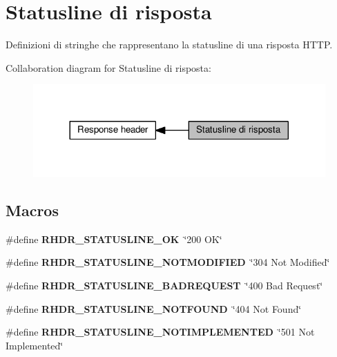 \hypertarget{group__RHDR__STATUSLINE}{}\section{Statusline di risposta}
\label{group__RHDR__STATUSLINE}


Definizioni di stringhe che rappresentano la statusline di una risposta H\+T\+T\+P.  


Collaboration diagram for Statusline di risposta\+:\nopagebreak
\begin{figure}[H]
\begin{center}
\leavevmode
\includegraphics[width=317pt]{group__RHDR__STATUSLINE}
\end{center}
\end{figure}
\subsection*{Macros}
\begin{DoxyCompactItemize}
\item 
\hypertarget{group__RHDR__STATUSLINE_ga52ab6e7e662b67329fe3570d298a09dd}{}\#define {\bfseries R\+H\+D\+R\+\_\+\+S\+T\+A\+T\+U\+S\+L\+I\+N\+E\+\_\+\+O\+K}~\char`\"{}200 O\+K\char`\"{}\label{group__RHDR__STATUSLINE_ga52ab6e7e662b67329fe3570d298a09dd}

\item 
\hypertarget{group__RHDR__STATUSLINE_gaca5230fd091f852c85521cecf20a7913}{}\#define {\bfseries R\+H\+D\+R\+\_\+\+S\+T\+A\+T\+U\+S\+L\+I\+N\+E\+\_\+\+N\+O\+T\+M\+O\+D\+I\+F\+I\+E\+D}~\char`\"{}304 Not Modified\char`\"{}\label{group__RHDR__STATUSLINE_gaca5230fd091f852c85521cecf20a7913}

\item 
\hypertarget{group__RHDR__STATUSLINE_ga6870f96252e7a41f53a796fedaf9982f}{}\#define {\bfseries R\+H\+D\+R\+\_\+\+S\+T\+A\+T\+U\+S\+L\+I\+N\+E\+\_\+\+B\+A\+D\+R\+E\+Q\+U\+E\+S\+T}~\char`\"{}400 Bad Request\char`\"{}\label{group__RHDR__STATUSLINE_ga6870f96252e7a41f53a796fedaf9982f}

\item 
\hypertarget{group__RHDR__STATUSLINE_ga2bfd669aa059c40e7bcb61402462eb84}{}\#define {\bfseries R\+H\+D\+R\+\_\+\+S\+T\+A\+T\+U\+S\+L\+I\+N\+E\+\_\+\+N\+O\+T\+F\+O\+U\+N\+D}~\char`\"{}404 Not Found\char`\"{}\label{group__RHDR__STATUSLINE_ga2bfd669aa059c40e7bcb61402462eb84}

\item 
\hypertarget{group__RHDR__STATUSLINE_gae1d88db08dad245759c37ff151ff0f22}{}\#define {\bfseries R\+H\+D\+R\+\_\+\+S\+T\+A\+T\+U\+S\+L\+I\+N\+E\+\_\+\+N\+O\+T\+I\+M\+P\+L\+E\+M\+E\+N\+T\+E\+D}~\char`\"{}501 Not Implemented\char`\"{}\label{group__RHDR__STATUSLINE_gae1d88db08dad245759c37ff151ff0f22}

\end{DoxyCompactItemize}


